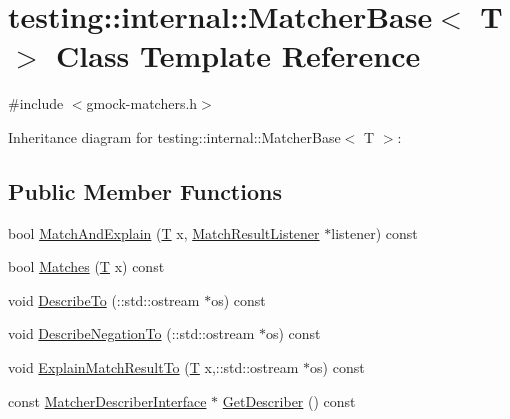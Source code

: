 \hypertarget{classtesting_1_1internal_1_1_matcher_base}{}\section{testing\+:\+:internal\+:\+:Matcher\+Base$<$ T $>$ Class Template Reference}
\label{classtesting_1_1internal_1_1_matcher_base}


{\ttfamily \#include $<$gmock-\/matchers.\+h$>$}



Inheritance diagram for testing\+:\+:internal\+:\+:Matcher\+Base$<$ T $>$\+:
\subsection*{Public Member Functions}
\begin{DoxyCompactItemize}
\item 
bool \hyperlink{classtesting_1_1internal_1_1_matcher_base_ae3f5f3150a95cafb1c2ab7c864a42e65}{Match\+And\+Explain} (\hyperlink{functions__7_8js_adf1f3edb9115acb0a1e04209b7a9937b}{T} x, \hyperlink{classtesting_1_1_match_result_listener}{Match\+Result\+Listener} $\ast$listener) const 
\item 
bool \hyperlink{classtesting_1_1internal_1_1_matcher_base_a105a9dae7afecee8898db8ad1887b0db}{Matches} (\hyperlink{functions__7_8js_adf1f3edb9115acb0a1e04209b7a9937b}{T} x) const 
\item 
void \hyperlink{classtesting_1_1internal_1_1_matcher_base_afcb24e7d1ff27e147e0e607d2a122467}{Describe\+To} (\+::std\+::ostream $\ast$os) const 
\item 
void \hyperlink{classtesting_1_1internal_1_1_matcher_base_a47cc840bc783fc0ceafbfb68d0ea5758}{Describe\+Negation\+To} (\+::std\+::ostream $\ast$os) const 
\item 
void \hyperlink{classtesting_1_1internal_1_1_matcher_base_a3a4c25a6e6c658b1fd52fd42c2fbd690}{Explain\+Match\+Result\+To} (\hyperlink{functions__7_8js_adf1f3edb9115acb0a1e04209b7a9937b}{T} x,\+::std\+::ostream $\ast$os) const 
\item 
const \hyperlink{classtesting_1_1_matcher_describer_interface}{Matcher\+Describer\+Interface} $\ast$ \hyperlink{classtesting_1_1internal_1_1_matcher_base_a716ce3d9f89cb63f9911d56f307b6ff6}{Get\+Describer} () const 
\end{DoxyCompactItemize}
